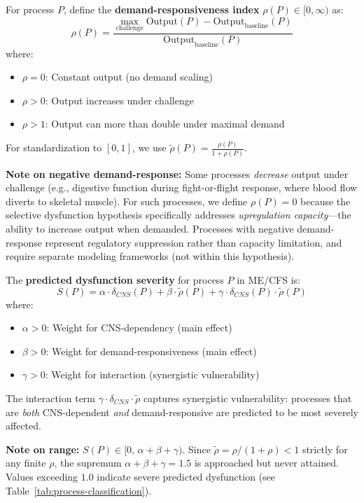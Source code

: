 \begin{definition}
\label{def:demand-responsiveness}
For process $P$, define the \textbf{demand-responsiveness index} $\rho(P) \in [0, \infty)$ as:
\[
\rho(P) = \frac{\max_{\text{challenge}} \text{Output}(P) - \text{Output}_{\text{baseline}}(P)}{\text{Output}_{\text{baseline}}(P)}
\]
where:
\begin{itemize}
    \item $\rho = 0$: Constant output (no demand scaling)
    \item $\rho > 0$: Output increases under challenge
    \item $\rho > 1$: Output can more than double under maximal demand
\end{itemize}

For standardization to $[0,1]$, we use $\tilde{\rho}(P) = \frac{\rho(P)}{1 + \rho(P)}$.

\textbf{Note on negative demand-response:} Some processes \emph{decrease} output under challenge (e.g., digestive function during fight-or-flight response, where blood flow diverts to skeletal muscle). For such processes, we define $\rho(P) = 0$ because the selective dysfunction hypothesis specifically addresses \emph{upregulation capacity}---the ability to increase output when demanded. Processes with negative demand-response represent regulatory suppression rather than capacity limitation, and require separate modeling frameworks (not within this hypothesis).
\end{definition}

\begin{definition}
\label{def:dysfunction-severity}
The \textbf{predicted dysfunction severity} for process $P$ in ME/CFS is:
\[
S(P) = \alpha \cdot \delta_{CNS}(P) + \beta \cdot \tilde{\rho}(P) + \gamma \cdot \delta_{CNS}(P) \cdot \tilde{\rho}(P)
\]
where:
\begin{itemize}
    \item $\alpha > 0$: Weight for CNS-dependency (main effect)
    \item $\beta > 0$: Weight for demand-responsiveness (main effect)
    \item $\gamma > 0$: Weight for interaction (synergistic vulnerability)
\end{itemize}

The interaction term $\gamma \cdot \delta_{CNS} \cdot \tilde{\rho}$ captures synergistic vulnerability: processes that are \emph{both} CNS-dependent \emph{and} demand-responsive are predicted to be most severely affected.

\textbf{Note on range:} $S(P) \in [0,\, \alpha + \beta + \gamma)$. Since $\tilde{\rho} = \rho/(1+\rho) < 1$ strictly for any finite $\rho$, the supremum $\alpha + \beta + \gamma = 1.5$ is approached but never attained. Values exceeding $1.0$ indicate severe predicted dysfunction (see Table~\ref{tab:process-classification}).
\end{definition}

